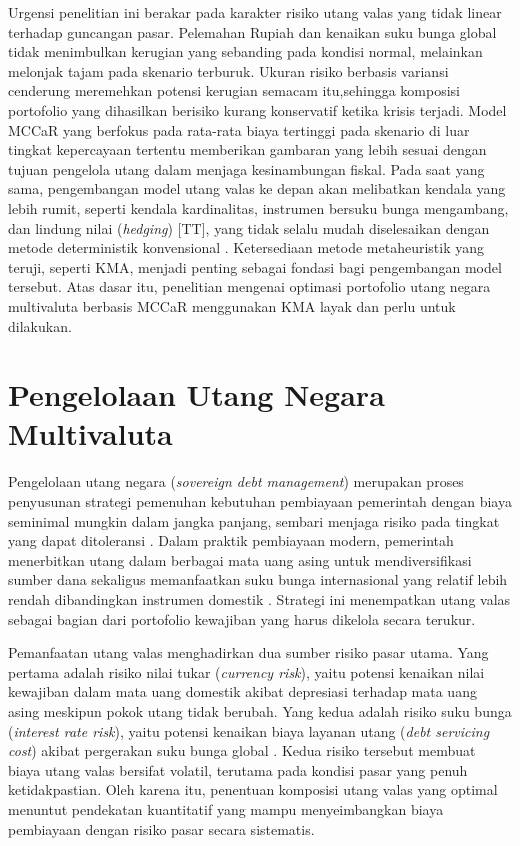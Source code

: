 
    
Urgensi penelitian ini berakar pada karakter risiko utang valas yang tidak linear terhadap guncangan pasar. Pelemahan Rupiah dan kenaikan suku bunga global tidak menimbulkan kerugian yang sebanding pada kondisi normal, melainkan melonjak tajam pada skenario terburuk. Ukuran risiko berbasis variansi cenderung meremehkan potensi kerugian semacam itu,sehingga komposisi portofolio yang dihasilkan berisiko kurang konservatif ketika krisis terjadi. Model MCCaR yang berfokus pada rata-rata biaya tertinggi pada skenario di luar tingkat kepercayaan tertentu memberikan gambaran yang lebih sesuai dengan tujuan pengelola utang dalam menjaga kesinambungan fiskal. Pada saat yang sama, pengembangan model utang valas ke depan akan melibatkan kendala yang lebih rumit, seperti kendala kardinalitas, instrumen bersuku bunga mengambang, dan lindung nilai (\textit{hedging}) [TT], yang tidak selalu mudah diselesaikan dengan metode deterministik konvensional . Ketersediaan metode metaheuristik yang teruji, seperti KMA, menjadi penting sebagai fondasi bagi pengembangan model tersebut. Atas dasar itu, penelitian mengenai optimasi portofolio utang negara multivaluta berbasis MCCaR menggunakan KMA layak dan perlu untuk dilakukan.


\section{Pengelolaan Utang Negara Multivaluta}\label{sec:utang}

Pengelolaan utang negara (\textit{sovereign debt management}) merupakan proses penyusunan strategi pemenuhan kebutuhan pembiayaan pemerintah dengan biaya seminimal mungkin dalam jangka panjang, sembari menjaga risiko pada tingkat yang dapat ditoleransi . Dalam praktik pembiayaan modern, pemerintah menerbitkan utang dalam berbagai mata uang asing untuk mendiversifikasi sumber dana sekaligus memanfaatkan suku bunga internasional yang relatif lebih rendah dibandingkan instrumen domestik . Strategi ini menempatkan utang valas sebagai bagian dari portofolio kewajiban yang harus dikelola secara terukur.

Pemanfaatan utang valas menghadirkan dua sumber risiko pasar utama. Yang pertama adalah risiko nilai tukar (\textit{currency risk}), yaitu potensi kenaikan nilai kewajiban dalam mata uang domestik akibat depresiasi terhadap mata uang asing meskipun pokok utang tidak berubah. Yang kedua adalah risiko suku bunga (\textit{interest rate risk}), yaitu potensi kenaikan biaya layanan utang (\textit{debt servicing cost}) akibat pergerakan suku bunga global . Kedua risiko tersebut membuat biaya utang valas bersifat volatil, terutama pada kondisi pasar yang penuh ketidakpastian. Oleh karena itu, penentuan komposisi utang valas yang optimal menuntut pendekatan kuantitatif yang mampu menyeimbangkan biaya pembiayaan dengan risiko pasar secara sistematis.

